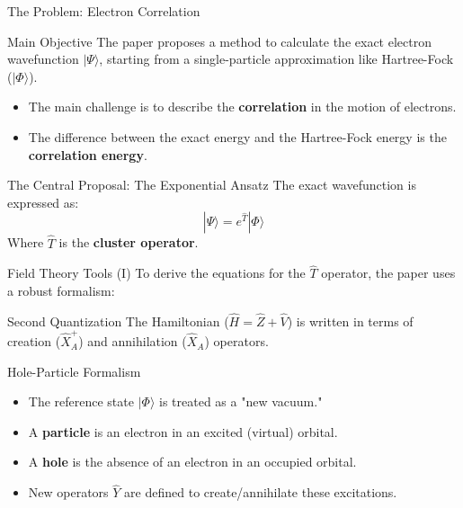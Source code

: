 \begin{frame}{The Problem: Electron Correlation}
    \begin{block}{Main Objective}
        The paper proposes a method to calculate the exact electron wavefunction $|\Psi\rangle$, starting from a single-particle approximation like Hartree-Fock ($|\Phi\rangle$).
    \end{block}
    \pause

    \begin{itemize}
        \item The main challenge is to describe the \textbf{correlation} in the motion of electrons.
        \pause
        \item The difference between the exact energy and the Hartree-Fock energy is the \textbf{correlation energy}.
    \end{itemize}
    \pause

    \begin{alertblock}{The Central Proposal: The Exponential Ansatz}
        The exact wavefunction is expressed as:
        \[
        |\Psi\rangle = e^{\hat{T}} |\Phi\rangle
        \]
        Where $\hat{T}$ is the \textbf{cluster operator}.
    \end{alertblock}
\end{frame}


\begin{frame}{Field Theory Tools (I)}
    To derive the equations for the $\hat{T}$ operator, the paper uses a robust formalism:
    \pause

    \begin{block}{Second Quantization}
        The Hamiltonian ($\hat{H} = \hat{Z} + \hat{V}$) is written in terms of creation ($\hat{X}_A^+$) and annihilation ($\hat{X}_A$) operators.
    \end{block}
    \pause
    
    \begin{block}{Hole-Particle Formalism}
        \begin{itemize}
            \item The reference state $|\Phi\rangle$ is treated as a "new vacuum."
            \pause
            \item A \textbf{particle} is an electron in an excited (virtual) orbital.
            \pause
            \item A \textbf{hole} is the absence of an electron in an occupied orbital.
            \pause
            \item New operators $\hat{Y}$ are defined to create/annihilate these excitations.
        \end{itemize}
    \end{block}
\end{frame}

